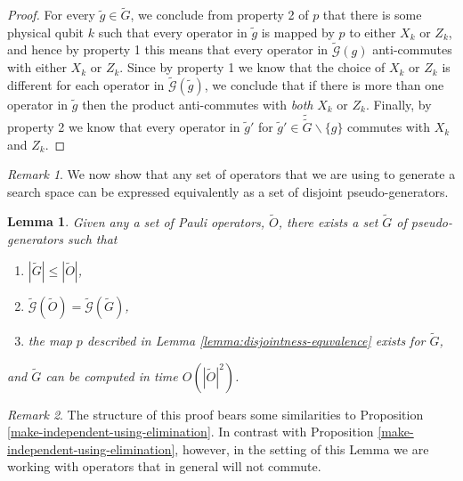 \documentclass{amsbook}
\theoremstyle{plain}
\newtheorem{lemma}{Lemma}
\theoremstyle{definition}
\theoremstyle{remark}
\newtheorem{remark}{Remark}
\newcommand{\set}{\tilde}
\newcommand{\genfun}{\tilde{\mathcal{G}}}
\begin{document}
\begin{proof}
For every $\set g\in\set G$, we conclude from property 2 of $p$ that there is some physical qubit $k$ such that every operator in $\set g$ is mapped by $p$ to either $X_k$ or $Z_k$, and hence by property 1 this means that every operator in $\genfun(g)$ anti-commutes with either $X_k$ or $Z_k$.  Since by property 1 we know that the choice of $X_k$ or $Z_k$ is different for each operator in $\genfun(\set g)$, we conclude that if there is more than one operator in $\set g$ then the product anti-commutes with \emph{both} $X_k$ or $Z_k$.  Finally, by property 2 we know that every operator in $\set g'$ for $\set g'\in\set \set G\backslash\{g\}$ commutes with $X_k$ and $Z_k$.
\end{proof}

\begin{remark}
We now show that any set of operators that we are using to generate a search space can be expressed equivalently as a set of disjoint pseudo-generators.
\end{remark}

\begin{lemma}
\label{lemma:computing-disjoint-pseudo-generators}
Given any a set of Pauli operators, $\set O$, there exists a set $\set G$ of pseudo-generators such that
\begin{enumerate}
\item $|\set G|\le|\set O|$,
\item $\genfun(\set O)=\genfun(\set G)$,
\item the map $p$ described in Lemma \ref{lemma:disjointness-equvalence} exists for $\set G$,
\end{enumerate}
and $\set G$ can be computed in time $O(|\set O|^2)$.
\end{lemma}

\begin{remark}
The structure of this proof bears some similarities to Proposition \ref{make-independent-using-elimination}.  In contrast with Proposition \ref{make-independent-using-elimination}, however, in the setting of this Lemma we are working with operators that in general will not commute.
\end{remark}
\end{document}
